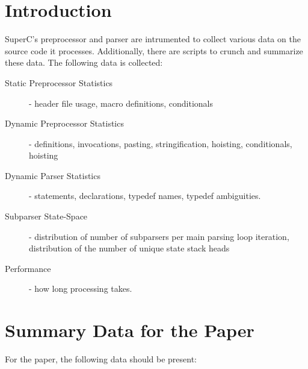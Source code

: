 \documentclass{report}
\newcommand{\SuperC}{{\textsf{Su\-perC}}}
\begin{document}
\section{Introduction}

\SuperC's preprocessor and parser are intrumented to collect various
data on the source code it processes.  Additionally, there are scripts
to crunch and summarize these data.  The following data is collected:

\begin{description}
\item[Static Preprocessor Statistics] - header file usage, macro
  definitions, conditionals
\item[Dynamic Preprocessor Statistics] - definitions, invocations,
  pasting, stringification, hoisting, conditionals, hoisting
\item[Dynamic Parser Statistics] - statements, declarations, typedef
  names, typedef ambiguities.
\item[Subparser State-Space] - distribution of number of subparsers
  per main parsing loop iteration, distribution of the number of
  unique state stack heads
\item[Performance] - how long processing takes.
\end{description}



\section{Summary Data for the Paper}

For the paper, the following data should be present:
\end{document}
